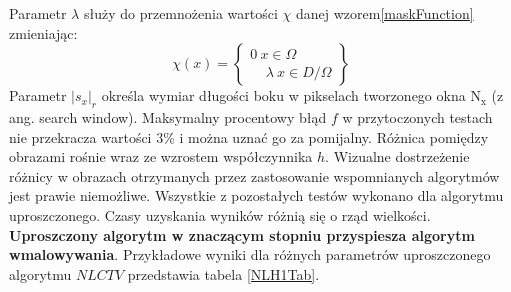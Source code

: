 \documentclass[a4paper,12pt,twoside,openany]{report}
\begin{document}
Parametr $\lambda$ służy do przemnożenia wartości $\chi$ danej wzorem\eqref{maskFunction} zmieniając:
\begin{equation}
\chi \left(x\right)=\left\{ \begin{array}{c}
0\ x \in \Omega \\ 
\ \ \ \ \ \lambda\ x \in D/ \Omega \end{array}
\right\}
\end{equation}
Parametr $|s_x|_r$ określa wymiar długości boku w pikselach tworzonego okna $\mathrm{N_x}$ (z ang. search window).
Maksymalny procentowy błąd $f$ w przytoczonych testach nie przekracza wartości 3\% i można uznać go za pomijalny. Różnica pomiędzy obrazami rośnie wraz ze wzrostem współczynnika $h$. Wizualne dostrzeżenie różnicy w obrazach otrzymanych przez zastosowanie wspomnianych algorytmów jest prawie niemożliwe. Wszystkie z pozostałych testów wykonano dla algorytmu uproszczonego. Czasy uzyskania wyników różnią się o rząd wielkości. \textbf{Uproszczony algorytm w znaczącym stopniu przyspiesza algorytm wmalowywania}. Przykładowe wyniki dla różnych parametrów uproszczonego algorytmu $NLCTV$ przedstawia tabela \autoref{NLH1Tab}.
\end{document}
